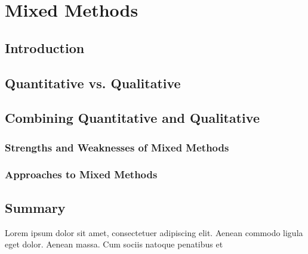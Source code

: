 \chapter{Mixed Methods}\label{ch14:mixed}

\section{Introduction}

\section{Quantitative vs. Qualitative}

\section{Combining Quantitative and Qualitative}

\subsection{Strengths and Weaknesses of Mixed Methods}

\subsection{Approaches to Mixed Methods}

\section{Summary}\label{ch14:summary}

Lorem ipsum dolor sit amet, consectetuer adipiscing elit. Aenean commodo ligula eget dolor. Aenean massa. Cum sociis natoque penatibus et
